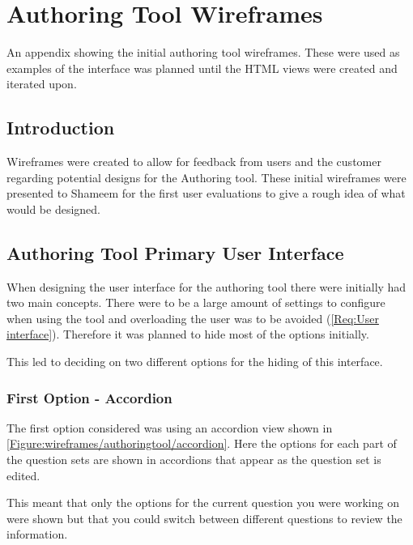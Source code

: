 \chapter{Authoring Tool Wireframes} \label{App:Authoring Tool Wireframes}

\begin{preamble}
	An appendix showing the initial authoring tool wireframes. These were used as examples of the interface was planned until the HTML views were created and iterated upon.
\end{preamble}

\section{Introduction}

Wireframes were created to allow for feedback from users and the customer regarding potential designs for the Authoring tool. These initial wireframes were presented to Shameem for the first user evaluations to give a rough idea of what would be designed.

\section{Authoring Tool Primary User Interface}

When designing the user interface for the authoring tool there were initially had two main concepts. There were to be a large amount of settings to configure when using the tool and overloading the user was to be avoided (\cref{Req:User interface}). Therefore it was planned to hide most of the options initially.

This led to deciding on two different options for the hiding of this interface.

\subsection{First Option - Accordion} 

The first option considered was using an accordion view shown in \autoref{Figure:wireframes/authoringtool/accordion}. Here the options for each part of the question sets are shown in accordions that appear as the question set is edited.

This meant that only the options for the current question you were working on were shown but that you could switch between different questions to review the information.

